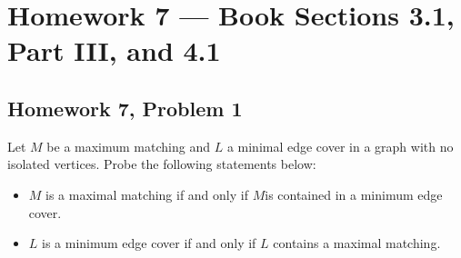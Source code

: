 \documentclass[12pt]{amsart}
\begin{document}
    \clearpage
    \section*{Homework 7 --- Book Sections 3.1, Part III, and 4.1}

    \subsection*{Homework 7, Problem 1} Let $M$ be a maximum matching and $L$ a minimal edge cover in a graph with no
    isolated vertices.
    Probe the following statements below:
    \begin{itemize}
        \item[(a)] $M$ is a maximal matching if and only if $M$is contained in a minimum edge cover.
        \item[(b)] $L$ is a minimum edge cover if and only if $L$ contains a maximal matching.
    \end{itemize}
\end{document}
